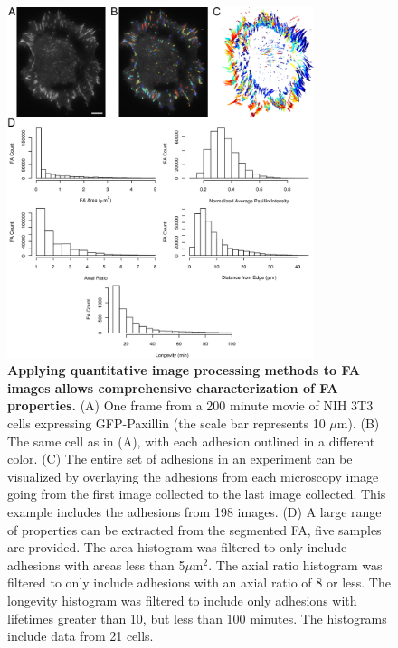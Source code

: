 \begin{figure}[htbp]
\begin{center}
\includegraphics[width=0.8\textwidth]{../figures/statics/statics}
\end{center}
\caption{
{\bf Applying quantitative image processing methods to FA images allows
comprehensive characterization of FA properties.} (A) One frame from a 200
minute movie of NIH 3T3 cells expressing GFP-Paxillin (the scale bar represents
10 $\mu$m). (B) The same cell as in (A), with each adhesion outlined in a
different color. (C) The entire set of adhesions in an experiment can be
visualized by overlaying the adhesions from each microscopy image going from the
first image collected to the last image collected. This example includes the
adhesions from 198 images. (D) A large range of properties can be extracted from
the segmented FA, five samples are provided.  The area histogram was filtered to
only include adhesions with areas less than 5$\mu$m$^2$. The axial ratio
histogram was filtered to only include adhesions with an axial ratio of 8 or
less. The longevity histogram was filtered to include only adhesions with
lifetimes greater than 10, but less than 100 minutes. The histograms include
data from 21 cells.
}
\label{statics}
\end{figure}


